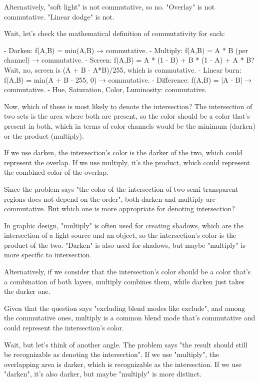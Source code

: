 Alternatively, "soft light" is not commutative, so no. "Overlay" is not commutative. "Linear dodge" is not. 

Wait, let's check the mathematical definition of commutativity for each:

- Darken: f(A,B) = min(A,B) → commutative.
- Multiply: f(A,B) = A * B (per channel) → commutative.
- Screen: f(A,B) = A * (1 - B) + B * (1 - A) + A * B? Wait, no, screen is (A + B - A*B)/255, which is commutative.
- Linear burn: f(A,B) = min(A + B - 255, 0) → commutative.
- Difference: f(A,B) = |A - B| → commutative.
- Hue, Saturation, Color, Luminosity: commutative.

Now, which of these is most likely to denote the intersection? The intersection of two sets is the area where both are present, so the color should be a color that's present in both, which in terms of color channels would be the minimum (darken) or the product (multiply). 

If we use darken, the intersection's color is the darker of the two, which could represent the overlap. If we use multiply, it's the product, which could represent the combined color of the overlap. 

Since the problem says "the color of the intersection of two semi-transparent regions does not depend on the order", both darken and multiply are commutative. But which one is more appropriate for denoting intersection? 

In graphic design, "multiply" is often used for creating shadows, which are the intersection of a light source and an object, so the intersection's color is the product of the two. "Darken" is also used for shadows, but maybe "multiply" is more specific to intersection. 

Alternatively, if we consider that the intersection's color should be a color that's a combination of both layers, multiply combines them, while darken just takes the darker one. 

Given that the question says "excluding blend modes like exclude", and among the commutative ones, multiply is a common blend mode that's commutative and could represent the intersection's color. 

Wait, but let's think of another angle. The problem says "the result should still be recognizable as denoting the intersection". If we use "multiply", the overlapping area is darker, which is recognizable as the intersection. If we use "darken", it's also darker, but maybe "multiply" is more distinct. 

